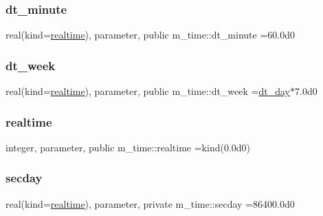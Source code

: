 \mbox{\label{namespacem__time_a9fe6fbb44e2779a2fcf96fba36c08918}} 
\subsubsection{\texorpdfstring{dt\+\_\+minute}{dt\_minute}}
{\footnotesize\ttfamily real(kind=\mbox{\hyperlink{namespacem__time_ac10ea9e8d59ec74eaa7d89f2517d7422}{realtime}}), parameter, public m\+\_\+time\+::dt\+\_\+minute =60.\+0d0}

\mbox{\label{namespacem__time_a3d53519e90264faccdae67e389ffc003}} 
\subsubsection{\texorpdfstring{dt\+\_\+week}{dt\_week}}
{\footnotesize\ttfamily real(kind=\mbox{\hyperlink{namespacem__time_ac10ea9e8d59ec74eaa7d89f2517d7422}{realtime}}), parameter, public m\+\_\+time\+::dt\+\_\+week =\mbox{\hyperlink{namespacem__time_a97725f8d657c24badff19a794f323a6b}{dt\+\_\+day}}$\ast$7.\+0d0}

\mbox{\label{namespacem__time_ac10ea9e8d59ec74eaa7d89f2517d7422}} 
\subsubsection{\texorpdfstring{realtime}{realtime}}
{\footnotesize\ttfamily integer, parameter, public m\+\_\+time\+::realtime =kind(0.\+0d0)}

\mbox{\label{namespacem__time_a48130b5a95a3f2e776269dcee1426797}} 
\subsubsection{\texorpdfstring{secday}{secday}}
{\footnotesize\ttfamily real(kind=\mbox{\hyperlink{namespacem__time_ac10ea9e8d59ec74eaa7d89f2517d7422}{realtime}}), parameter, private m\+\_\+time\+::secday =86400.\+0d0\hspace{0.3cm}{\ttfamily [private]}}

